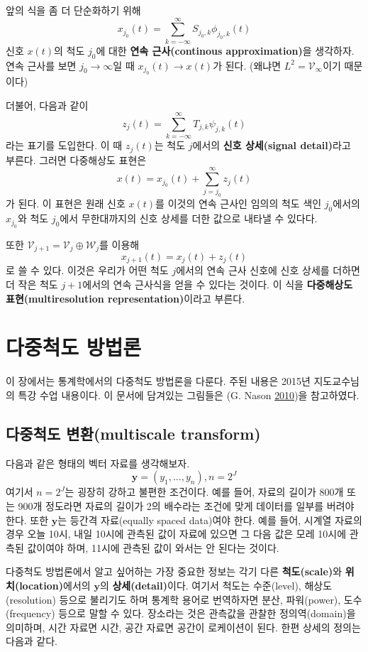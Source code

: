 \documentclass[b5paper,]{book}
\theoremstyle{definition}
\theoremstyle{definition}
\theoremstyle{definition}
\theoremstyle{remark}
\begin{document}
앞의 식을 좀 더 단순화하기 위해
\[x_{j_{0}}(t)=\sum_{k=-\infty}^{\infty}S_{j_{0},k}\phi_{j_{0},k}(t)\]
신호 \(x(t)\)의 척도 \(j_{0}\)에 대한 \textbf{연속 근사(continous
approximation)}을 생각하자. 연속 근사를 보면
\(j_{0}\rightarrow \infty\)일 때 \(x_{j_{0}}(t)\rightarrow x(t)\)가
된다. (왜냐면 \(L^{2}=\mathcal{V}_{\infty}\)이기 때문이다)

더불어, 다음과 같이
\[z_{j}(t)=\sum_{k=-\infty}^{\infty}T_{j,k}\psi_{j,k}(t)\] 라는 표기를
도입한다. 이 때 \(z_{j}(t)\)는 척도 \(j\)에서의 \textbf{신호 상세(signal
detail)}라고 부른다. 그러면 다중해상도 표현은
\[x(t)=x_{j_{0}}(t)+\sum_{j=j_{0}}^{\infty}z_{j}(t)\] 가 된다. 이 표현은
원래 신호 \(x(t)\)를 이것의 연속 근사인 임의의 척도 색인 \(j_{0}\)에서의
\(x_{j_{0}}\)와 척도 \(j_{0}\)에서 무한대까지의 신호 상세를 더한 값으로
내타낼 수 있다다.

또한 \(\mathcal{V}_{j+1}=\mathcal{V}_{j}\oplus\mathcal{W}_{j}\)를 이용해
\[x_{j+1}(t)=x_{j}(t)+z_{j}(t)\] 로 쓸 수 있다. 이것은 우리가 어떤 척도
\(j\)에서의 연속 근사 신호에 신호 상세를 더하면 더 작은 척도
\(j+1\)에서의 연속 근사식을 얻을 수 있다는 것이다. 이 식을
\textbf{다중해상도 표현(multiresolution representation)}이라고 부른다.

\chapter{다중척도 방법론}\label{multiscale}

이 장에서는 통계학에서의 다중척도 방법론을 다룬다. 주된 내용은 2015년
지도교수님의 특강 수업 내용이다. 이 문서에 담겨있는 그림들은 (G. Nason
\protect\hyperlink{ref-Nason2010}{2010})을 참고하였다.

\section{다중척도 변환(multiscale
transform)}\label{-multiscale-transform}

다음과 같은 형태의 벡터 자료를 생각해보자.
\[ \mathbf{y}=(y_{1},\ldots,y_{n}), n=2^{J}\] 여기서 \(n=2^{J}\)는
굉장히 강하고 불편한 조건이다. 예를 들어, 자료의 길이가 800개 또는 900개
정도라면 자료의 길이가 2의 배수라는 조건에 맞게 데이터를 일부를 버려야
한다. 또한 \(\mathbf{y}\)는 등간격 자료(equally spaced data)여야 한다.
예를 들어, 시계열 자료의 경우 오늘 10시, 내일 10시에 관측된 값이 자료에
있으면 그 다음 값은 모레 10시에 관측된 값이여야 하며, 11시에 관측된 값이
와서는 안 된다는 것이다.

다중척도 방법론에서 알고 싶어하는 가장 중요한 정보는 각기 다른
\textbf{척도(scale)}와 \textbf{위치(location)}에서의 \(\mathbf{y}\)의
\textbf{상세(detail)}이다. 여기서 척도는 수준(level), 해상도(resolution)
등으로 불리기도 하며 통계학 용어로 번역하자면 분산, 파워(power),
도수(frequency) 등으로 말할 수 있다. 장소라는 것은 관측값을 관찰한
정의역(domain)을 의미하며, 시간 자료면 시간, 공간 자료면 공간이
로케이션이 된다. 한편 상세의 정의는 다음과 같다.
\end{document}
